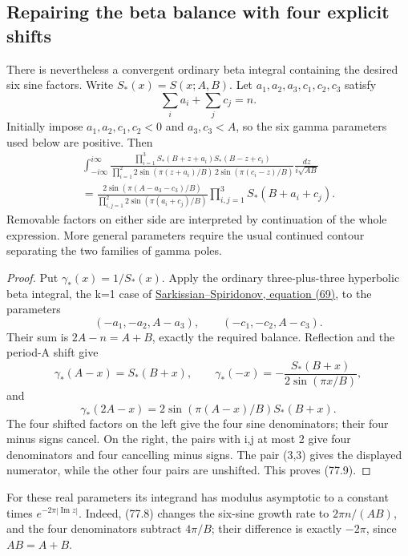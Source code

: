 \documentclass[11pt,reqno]{amsart}
\theoremstyle{plain}
\begin{document}
\subsection{Repairing the beta balance with four explicit shifts}\label{sec:77.4}

There is nevertheless a convergent ordinary beta integral containing
the desired six sine factors. Write \(S_*(x)=S(x;A,B)\).
Let \(a_1,a_2,a_3,c_1,c_2,c_3\) satisfy
\begin{equation*}
 \sum_i a_i+\sum_j c_j=n.
 \tag{77.8}
\end{equation*}
Initially impose
\(a_1,a_2,c_1,c_2<0\) and \(a_3,c_3<A\), so the six
gamma parameters used below are positive. Then
\begin{equation*}
 \boxed{\begin{gathered}
 \int_{-i\infty}^{i\infty}
 \frac{\prod_{i=1}^3S_*(B+z+a_i)S_*(B-z+c_i)}
      {\prod_{i=1}^2
       2\sin(\pi(z+a_i)/B)\,2\sin(\pi(c_i-z)/B)}
 \frac{dz}{i\sqrt{AB}}\\
 {}=\frac{2\sin(\pi(A-a_3-c_3)/B)}
      {\prod_{i,j=1}^2 2\sin(\pi(a_i+c_j)/B)}
 \prod_{i,j=1}^3 S_*(B+a_i+c_j).
 \end{gathered}}
 \tag{77.9}
\end{equation*}
Removable factors on either side are interpreted by continuation of the
whole expression. More general parameters require the usual continued
contour separating the two families of gamma poles.

\begin{proof}
Put \(\gamma_*(x)=1/S_*(x)\). Apply the ordinary
three-plus-three hyperbolic beta integral, the k=1 case of
\href{https://arxiv.org/html/1910.11747\#S4}{Sarkissian--Spiridonov, equation (69)},
to the parameters
\[
 (-a_1,-a_2,A-a_3),\qquad
 (-c_1,-c_2,A-c_3).
\]
Their sum is \(2A-n=A+B\), exactly the required balance.
Reflection and the period-A shift give
\[
 \gamma_*(A-x)=S_*(B+x),\qquad
 \gamma_*(-x)=-\frac{S_*(B+x)}{2\sin(\pi x/B)},
\]
and
\[
 \gamma_*(2A-x)=2\sin(\pi(A-x)/B)S_*(B+x).
\]
The four shifted factors on the left give the four sine denominators;
their four minus signs cancel. On the right, the pairs with i,j at
most 2 give four denominators and four cancelling minus signs. The
pair (3,3) gives the displayed numerator, while the other four pairs
are unshifted. This proves (77.9).
\end{proof}

For these real parameters its integrand has modulus asymptotic to a
constant times \(e^{-2\pi|\operatorname{Im}z|}\). Indeed, (77.8)
changes the six-sine growth rate to \(2\pi n/(AB)\), and the four
denominators subtract \(4\pi/B\); their difference is exactly
\(-2\pi\), since \(AB=A+B\).
\end{document}
